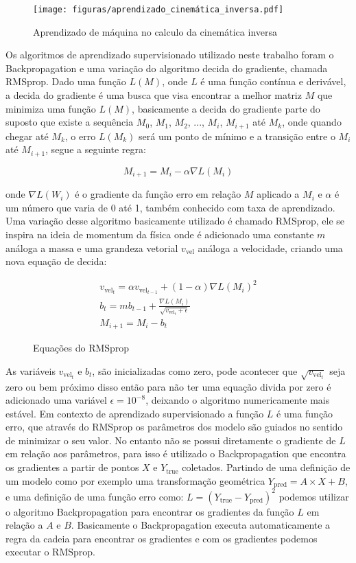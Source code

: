 \begin{figure}[H]
    \centering
    \texttt{[image: figuras/aprendizado\_cinemática\_inversa.pdf]}
    \caption{Aprendizado de máquina no calculo da cinemática inversa}
\end{figure}

Os algoritmos de aprendizado supervisionado utilizado neste trabalho
foram o Backpropagation e uma variação do algoritmo decida do gradiente, chamada
RMSprop.
Dado uma função $L(M)$, onde $L$ é uma função contínua e derivável,
a decida do gradiente é uma busca que visa encontrar
a melhor matriz $M$ que minimiza uma função $L(M)$, basicamente a
decida do gradiente parte do suposto que existe a sequência
$M_0$, $M_1$, $M_2$, ..., $M_i$, $M_{i+1}$ até $M_k$, onde quando
chegar até $M_k$, o erro $L(M_k)$ será um ponto de mínimo e a transição
entre o $M_{i}$ até $M_{i+1}$, segue a seguinte regra:

\begin{equation}
    M_{i+1} = M_i -\alpha \nabla L(M_i)
\end{equation}

onde $\nabla L(W_i)$ é o gradiente da função erro em relação $M$ aplicado
a $M_i$ e $\alpha$ é um número que varia de 0 até 1,
também conhecido com taxa de aprendizado. Uma variação desse algoritmo
basicamente utilizado é chamado RMSprop, ele se inspira na ideia de momentum
da física  onde  é adicionado uma constante $m$ análoga a massa e uma grandeza
vetorial $v_{\text{vel}}$ análoga a velocidade, criando uma nova equação de decida:

\begin{figure}[H]
    \begin{align*}
        v_{\text{vel}_t} = \alpha v_{\text{vel}_{t-1}} + (1 - \alpha)\nabla L(M_i)^2 \\
        b_t = mb_{t-1} + \frac{\nabla L(M_i)}{\sqrt{v_{\text{vel}_t} + \epsilon}} \\
        M_{i+1} = M_i - b_t
    \end{align*}
    \caption{Equações do RMSprop}
\end{figure}

As variáveis $v_{\text{vel}_t}$ e  $b_t$, são inicializadas como zero, pode acontecer
que  $\sqrt{v_{\text{vel}_t}}$ seja zero ou bem próximo disso então para não ter uma equação
divida por zero é adicionado uma variável $\epsilon =10^{-8}$, deixando o algoritmo numericamente
mais estável. Em contexto de aprendizado supervisionado a função $L$ é uma função erro, que 
através do RMSprop os parâmetros dos modelo são guiados no sentido de minimizar o seu valor.
No entanto não se possui diretamente o gradiente de $L$ em relação aos parâmetros, para isso
é utilizado o  Backpropagation que encontra os gradientes a partir
de pontos $X$ e $Y_{\text{true}}$ coletados. Partindo de  uma definição de um modelo como por exemplo uma
transformação geométrica $Y_{\text{pred}}= A \times X + B$, e uma definição de uma função
erro como: $L=(Y_{\text{true}}- Y_{\text{pred}})^2$ podemos utilizar o algoritmo
Backpropagation para encontrar os gradientes da função $L$ em relação a $A$
e  $B$. Basicamente o Backpropagation executa automaticamente a regra da cadeia
para encontrar os gradientes e com os gradientes podemos executar o RMSprop.

